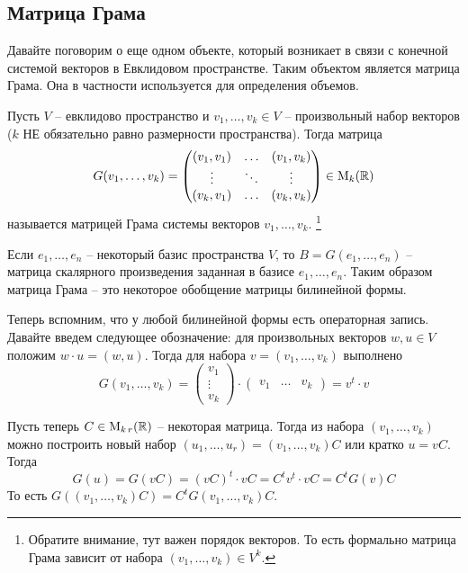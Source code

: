 \subsection{Матрица Грама}
\label{subsection::Gram}

Давайте поговорим о еще одном объекте, который возникает в связи с конечной системой векторов в Евклидовом пространстве.
Таким объектом является матрица Грама.
Она в частности используется для определения объемов.

\begin{definition}
Пусть $V$ -- евклидово пространство и $v_1,\ldots,v_k\in V$ -- произвольный набор векторов ($k$ НЕ обязательно равно размерности пространства).
Тогда матрица
\[
G(v_1,\ldots,v_k) =
\begin{pmatrix}
{(v_1,v_1)}&{\ldots}&{(v_1,v_k)}\\
{\vdots}&{\ddots}&{\vdots}\\
{(v_k,v_1)}&{\ldots}&{(v_k,v_k)}\\
\end{pmatrix}
\in\operatorname{M}_{k}(\mathbb R)
\]
называется матрицей Грама системы векторов $v_1,\ldots,v_k$.%
\footnote{Обратите внимание, тут важен порядок векторов.
То есть формально матрица Грама зависит от набора $(v_1,\ldots,v_k)\in V^k$.}
\end{definition}

Если $e_1,\ldots,e_n$ -- некоторый базис пространства $V$, то $B = G(e_1,\ldots,e_n)$ -- матрица скалярного произведения заданная в базисе $e_1,\ldots,e_n$.
Таким образом матрица Грама -- это некоторое обобщение матрицы билинейной формы.

Теперь вспомним, что у любой билинейной формы есть операторная запись.
Давайте введем следующее обозначение: для произвольных векторов $w, u\in V$ положим $w\cdot u = (w, u)$.
Тогда для набора $v = (v_1,\ldots,v_k)$ выполнено
\[
G(v_1,\ldots,v_k) = 
\begin{pmatrix}
{v_1}\\{\vdots}\\{v_k}
\end{pmatrix}
\cdot
\begin{pmatrix}
{v_1}&{\ldots}&{v_k}
\end{pmatrix}
=
v^t \cdot v
\]

Пусть теперь $C\in \operatorname{M}_{k\,r}(\mathbb R)$ -- некоторая матрица.
Тогда из набора $(v_1,\ldots,v_k)$ можно построить новый набор $(u_1,\ldots,u_r) = (v_1,\ldots,v_k)C$ или кратко $u = vC$.
Тогда 
\[
G(u) = G(vC) = (vC)^t \cdot vC = C^t v^t \cdot v C = C^t G(v) C
\]
То есть $G((v_1,\ldots,v_k)C) = C^t G(v_1,\ldots,v_k)C$.


